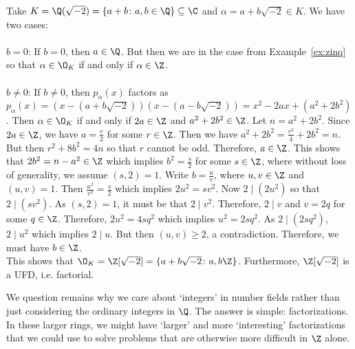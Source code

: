 \begin{ex}
Take $K=\Q(\sqrt{-2})=\{a+b \colon a,b \in \Q\} \subseteq \C$ and $\alpha= a + b\sqrt{-2} \in K$. We have two cases: \\ \\
	\indent $b=0$: If $b=0$, then $a \in \Q$. But then we are in the case from Example~\ref{ex:zinq} so that $\alpha \in \O_K$ if and only if $\alpha \in \Z$. \\ \\
	\indent $b\neq 0$: If $b \neq 0$,  then $p_\alpha(x)$ factors as $p_\alpha(x)=(x-(a+b\sqrt{-2}))(x-(a-b\sqrt{-2}))=x^2-2ax+(a^2+2b^2)$. Then $\alpha \in \O_K$ if and only if $2a \in \Z$ and $a^2+2b^2 \in \Z$. Let $n=a^2+2b^2$. Since $2a \in \Z$, we have $a=\frac{r}{2}$ for some $r \in \Z$. Then we have $a^2+2b^2= \frac{r^2}{4}+2b^2=n$. But then $r^2+8b^2=4n$ so that $r$ cannot be odd. Therefore, $a \in \Z$. This shows that $2b^2= n - a^2 \in \Z$ which implies $b^2=\frac{s}{2}$ for some $s \in \Z$, where without loss of generality, we assume $(s,2)=1$. Write $b=\frac{u}{v}$, where $u,v \in \Z$ and $(u,v)=1$. Then $\frac{u^2}{v^2}=\frac{s}{2}$ which implies $2u^2=sv^2$. Now $2 \mid (2u^2)$ so that $2 \mid (sv^2)$. As $(s,2)=1$, it must be that $2 \mid v^2$. Therefore, $2 \mid v$ and $v=2q$ for some $q \in \Z$. Therefore, $2u^2= 4sq^2$ which implies $u^2=2sq^2$. As $2 \mid (2sq^2)$, $2 \mid u^2$ which implies $2 \mid u$. But then $(u,v) \geq 2$, a contradiction. Therefore, we must have $b \in \Z$. \\
	
This shows that $\O_K=\Z[\sqrt{-2}]=\{a+b\sqrt{-2} \colon a,b \Z\}$. Furthermore, $\Z[\sqrt{-2}]$ is a UFD, i.e. factorial. \xqed
\end{ex}


We question remains why we care about `integers' in number fields rather than just considering the ordinary integers in $\Q$. The answer is simple: factorizations. In these larger rings, we might have `larger' and more `interesting' factorizations that we could use to solve problems that are otherwise more difficult in $\Z$ alone. 



